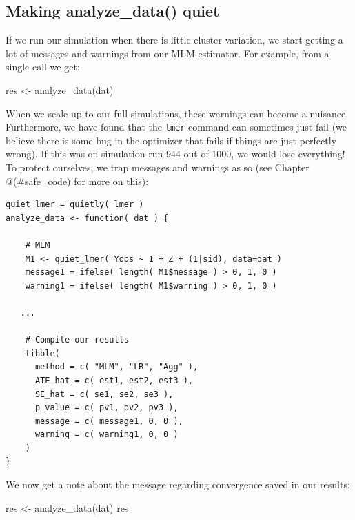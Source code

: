 \documentclass[
]{book}
\newenvironment{Shaded}{\begin{snugshade}}{\end{snugshade}}
\newcommand{\FunctionTok}[1]{\textcolor[rgb]{0.00,0.00,0.00}{#1}}
\newcommand{\NormalTok}[1]{#1}
\newcommand{\OtherTok}[1]{\textcolor[rgb]{0.56,0.35,0.01}{#1}}
\begin{document}
\hypertarget{making-analyze_data-quiet}{%
\subsection{Making analyze\_data() quiet}\label{making-analyze_data-quiet}}

If we run our simulation when there is little cluster variation, we start getting a lot of messages and warnings from our MLM estimator.
For example, from a single call we get:

\begin{Shaded}
\begin{Highlighting}[]
\NormalTok{res }\OtherTok{\textless{}{-}} \FunctionTok{analyze\_data}\NormalTok{(dat)}
\end{Highlighting}
\end{Shaded}

When we scale up to our full simulations, these warnings can become a nuisance.
Furthermore, we have found that the \texttt{lmer} command can sometimes just fail (we believe there is some bug in the optimizer that fails if things are just perfectly wrong).
If this was on simulation run 944 out of 1000, we would lose everything!
To protect ourselves, we trap messages and warnings as so (see Chapter @(\#safe\_code) for more on this):

\begin{verbatim}
quiet_lmer = quietly( lmer )
analyze_data <- function( dat ) {
    
    # MLM
    M1 <- quiet_lmer( Yobs ~ 1 + Z + (1|sid), data=dat )
    message1 = ifelse( length( M1$message ) > 0, 1, 0 )
    warning1 = ifelse( length( M1$warning ) > 0, 1, 0 )

   ...

    # Compile our results
    tibble( 
      method = c( "MLM", "LR", "Agg" ),
      ATE_hat = c( est1, est2, est3 ),
      SE_hat = c( se1, se2, se3 ),
      p_value = c( pv1, pv2, pv3 ),
      message = c( message1, 0, 0 ),
      warning = c( warning1, 0, 0 )
    )
}
\end{verbatim}

We now get a note about the message regarding convergence saved in our results:

\begin{Shaded}
\begin{Highlighting}[]
\NormalTok{res }\OtherTok{\textless{}{-}} \FunctionTok{analyze\_data}\NormalTok{(dat)}
\NormalTok{res}
\end{Highlighting}
\end{Shaded}
\end{document}
